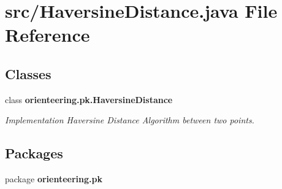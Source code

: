 \section{src/\+Haversine\+Distance.java File Reference}
\label{HaversineDistance_8java}
\subsection*{Classes}
\begin{DoxyCompactItemize}
\item 
class \textbf{ orienteering.\+pk.\+Haversine\+Distance}
\begin{DoxyCompactList}\small\item\em Implementation Haversine Distance Algorithm between two points. \end{DoxyCompactList}\end{DoxyCompactItemize}
\subsection*{Packages}
\begin{DoxyCompactItemize}
\item 
package \textbf{ orienteering.\+pk}
\end{DoxyCompactItemize}
